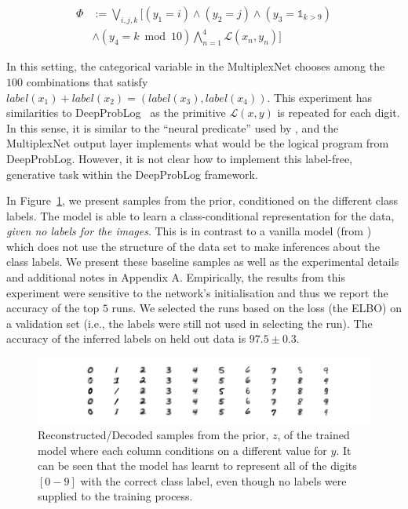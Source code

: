 \documentclass[letterpaper]{article} %
\begin{document}
\begin{equation}
    \begin{split}
    \label{eq:mnist_domain_knowledge}
    \Phi &:= \bigvee_{i,j,k} \Big[ ( y_1 = i ) \land ( y_2 = j ) \land ( y_3 = \mathds{1}_{k>9} ) \\
         & \land ( y_4 = k \bmod 10 ) \bigwedge\limits_{n=1}^4 \mathcal{L}(x_n, y_n) \Big]
    \end{split}
\end{equation}

In this setting, the categorical variable in the MultiplexNet chooses among the $100$ combinations that satisfy $label(x_1) + label(x_2) = (label(x_3), label(x_4))$.
This experiment has similarities to DeepProbLog~\citep{manhaeve2018deepproblog} as the primitive $\mathcal{L}(x, y)$ is repeated for each digit.
In this sense, it is similar to the ``neural predicate'' used by \citet{manhaeve2018deepproblog}, and the MultiplexNet output layer implements what would be the logical program from DeepProbLog.
However, it is not clear how to implement this label-free, generative task within the DeepProbLog framework.

In Figure~\ref{fig:mnist_prior_samples}, we present samples from the prior, conditioned on the different class labels. 
The model is able to learn a class-conditional representation for the data, \textit{given no labels for the images}.
This is in contrast to a vanilla model (from \citet{kingma2014semi}) which does not use the structure of the data set to make inferences about the class labels.
We present these baseline samples as well as the experimental details and additional notes in Appendix A.
Empirically, the results from this experiment were sensitive to the network's initialisation and thus we report the accuracy of the top $5$ runs.
We selected the runs based on the loss (the ELBO) on a validation set 
(i.e., the labels were still not used in selecting the run). 
The accuracy of the inferred labels on held out data is $97.5 \pm 0.3$.

\begin{figure}
  \centering
  \includegraphics[width=.5\textwidth]{images/mnist_samples_from_prior.png}
  \caption{Reconstructed/Decoded samples from the prior, $z$, of the trained model where each column conditions on a different value for $y$. It can be seen that the model has learnt to represent all of the digits $[0-9]$  with the correct class label, even though no labels were supplied to the training process.}
  \label{fig:mnist_prior_samples}
\end{figure}
\end{document}
